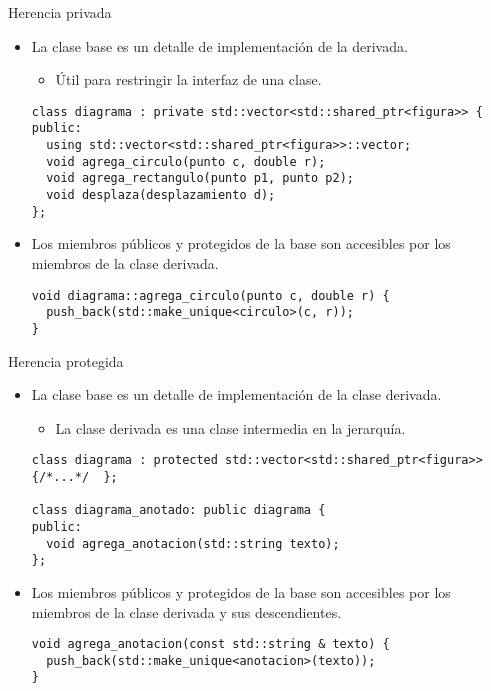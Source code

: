 \begin{frame}[t,fragile]{Herencia privada}
\begin{itemize}
  \item La clase base es un detalle de implementación de la derivada.
    \begin{itemize}
      \item Útil para restringir la interfaz de una clase.
    \end{itemize}
\begin{lstlisting}
class diagrama : private std::vector<std::shared_ptr<figura>> {
public:
  using std::vector<std::shared_ptr<figura>>::vector;
  void agrega_circulo(punto c, double r); 
  void agrega_rectangulo(punto p1, punto p2);
  void desplaza(desplazamiento d);
};
\end{lstlisting}

  \item Los miembros públicos y protegidos de la base
        son accesibles por los miembros de la clase derivada.
\begin{lstlisting}
void diagrama::agrega_circulo(punto c, double r) {
  push_back(std::make_unique<circulo>(c, r));
}
\end{lstlisting}
\end{itemize}
\end{frame}

\begin{frame}[t,fragile]{Herencia protegida}
\begin{itemize}
  \item La clase base es un detalle de implementación 
        de la clase derivada.
    \begin{itemize}
      \item La clase derivada es una clase intermedia en la jerarquía.
    \end{itemize}
\begin{lstlisting}
class diagrama : protected std::vector<std::shared_ptr<figura>> {/*...*/  };

class diagrama_anotado: public diagrama { 
public:
  void agrega_anotacion(std::string texto);
};
\end{lstlisting}

  \item Los miembros públicos y protegidos de la base
        son accesibles por los miembros de la clase derivada
        y sus descendientes.
\begin{lstlisting}
void agrega_anotacion(const std::string & texto) {
  push_back(std::make_unique<anotacion>(texto));
}
\end{lstlisting}

\end{itemize}
\end{frame}
